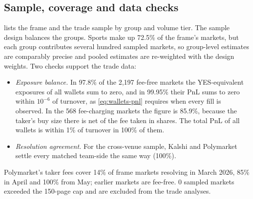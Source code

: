 \subsection{Sample, coverage and data checks}\label{app:wallets-coverage}
 lists the frame and the trade sample by group and volume tier. The sample design
balances the groups. Sports make up 72.5\% of the frame's markets, but each group
contributes several hundred sampled markets, so group-level estimates are comparably precise and pooled
estimates are re-weighted with the design weights. Two checks support the trade data:
\begin{itemize}
  \item \emph{Exposure balance.} In 97.8\% of the 2{,}197 fee-free
    markets the YES-equivalent exposures of all wallets sum to zero, and in 99.95\%
    their PnL sums to zero within $10^{-6}$ of turnover, as \eqref{eq:wallets-pnl} requires when every fill is
    observed. In the 568 fee-charging markets the figure is
    85.9\%, because the taker's buy size there is net of the fee taken in
    shares. The total PnL of all wallets is within 1\% of turnover in 100\%
    of them.
  \item \emph{Resolution agreement.} For the cross-venue sample, Kalshi and Polymarket settle every matched
    team-side the same way (100\%).
\end{itemize}
Polymarket's taker fees cover 14\% of frame markets resolving in March 2026,
85\% in April and 100\% from May; earlier markets are fee-free.
0 sampled markets exceeded the 150-page cap and are excluded from the trade analyses.

